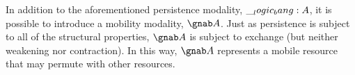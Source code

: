 
In addition to the aforementioned persistence modality, $\__logic_bang: A$, it is possible to introduce a mobility modality, $\gnab A$.\autocite{??}
Just as persistence is subject to all of the structural properties, $\gnab A$ is subject to exchange (but neither weakening nor contraction).
In this way, $\gnab A$ represents a mobile resource that may permute with other resources.












